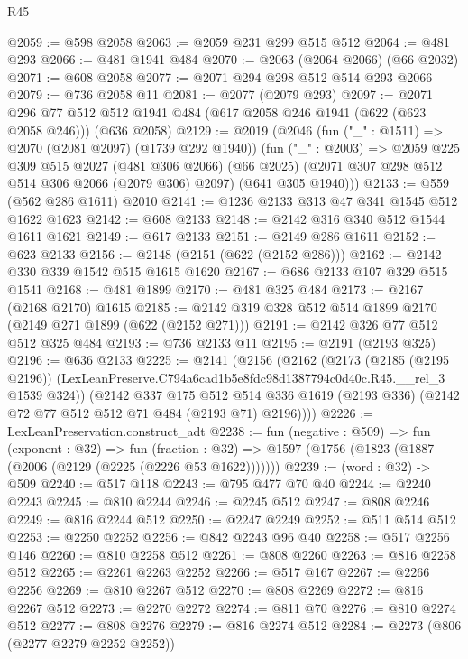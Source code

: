 \begin{lexlean}{R45}
\begin{coremodule}
@2059 := @598 @2058
@2063 := @2059 @231 @299 @515 @512
@2064 := @481 @293
@2066 := @481 @1941 @484
@2070 := @2063 (@2064 @2066) (@66 @2032)
@2071 := @608 @2058
@2077 := @2071 @294 @298 @512 @514 @293 @2066
@2079 := @736 @2058 @11
@2081 := @2077 (@2079 @293)
@2097 := @2071
    @296
    @77
    @512
    @512
    @1941
    @484
    (@617 @2058 @246 @1941 (@622 (@623 @2058 @246)))
    (@636 @2058)
@2129 := @2019
    (@2046
      (fun ("_" : @1511) => @2070 (@2081 @2097) (@1739 @292 @1940))
      (fun ("_" : @2003) =>
      @2059
        @225
        @309
        @515
        @2027
        (@481 @306 @2066)
        (@66 @2025)
        (@2071 @307 @298 @512 @514 @306 @2066 (@2079 @306) @2097)
        (@641 @305 @1940)))
@2133 := @559 (@562 @286 @1611) @2010
@2141 := @1236 @2133 @313 @47 @341 @1545 @512 @1622 @1623
@2142 := @608 @2133
@2148 := @2142 @316 @340 @512 @1544 @1611 @1621
@2149 := @617 @2133
@2151 := @2149 @286 @1611
@2152 := @623 @2133
@2156 := @2148 (@2151 (@622 (@2152 @286)))
@2162 := @2142 @330 @339 @1542 @515 @1615 @1620
@2167 := @686 @2133 @107 @329 @515 @1541
@2168 := @481 @1899
@2170 := @481 @325 @484
@2173 := @2167 (@2168 @2170) @1615
@2185 := @2142 @319 @328 @512 @514 @1899 @2170 (@2149 @271 @1899 (@622 (@2152 @271)))
@2191 := @2142 @326 @77 @512 @512 @325 @484
@2193 := @736 @2133 @11
@2195 := @2191 (@2193 @325)
@2196 := @636 @2133
@2225 := @2141
    (@2156
      (@2162
        (@2173
          (@2185 (@2195 @2196))
          (LexLeanPreserve.C794a6cad1b5e8fdc98d1387794c0d40c.R45.__rel_3 @1539 @324))
        (@2142
          @337
          @175
          @512
          @514
          @336
          @1619
          (@2193 @336)
          (@2142 @72 @77 @512 @512 @71 @484 (@2193 @71) @2196))))
@2226 := LexLeanPreservation.construct_adt
@2238 := fun (negative : @509) =>
  fun (exponent : @32) =>
  fun (fraction : @32) => @1597 (@1756 (@1823 (@1887 (@2006 (@2129 (@2225 (@2226 @53 @1622)))))))
@2239 := (word : @32) -> @509
@2240 := @517 @118
@2243 := @795 @477 @70 @40
@2244 := @2240 @2243
@2245 := @810 @2244
@2246 := @2245 @512
@2247 := @808 @2246
@2249 := @816 @2244 @512
@2250 := @2247 @2249
@2252 := @511 @514 @512
@2253 := @2250 @2252
@2256 := @842 @2243 @96 @40
@2258 := @517 @2256 @146
@2260 := @810 @2258 @512
@2261 := @808 @2260
@2263 := @816 @2258 @512
@2265 := @2261 @2263 @2252
@2266 := @517 @167
@2267 := @2266 @2256
@2269 := @810 @2267 @512
@2270 := @808 @2269
@2272 := @816 @2267 @512
@2273 := @2270 @2272
@2274 := @811 @70
@2276 := @810 @2274 @512
@2277 := @808 @2276
@2279 := @816 @2274 @512
@2284 := @2273 (@806 (@2277 @2279 @2252 @2252))

\end{coremodule}
\end{lexlean}

